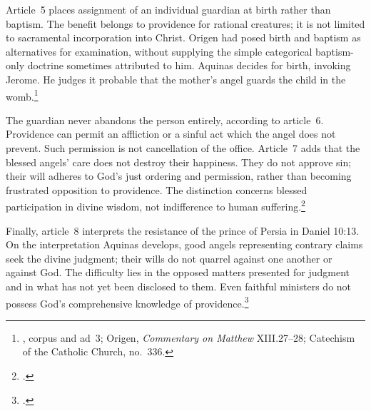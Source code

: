Article~5 places assignment of an individual guardian at birth rather than baptism. The benefit belongs to providence for rational creatures; it is not limited to sacramental incorporation into Christ. Origen had posed birth and baptism as alternatives for examination, without supplying the simple categorical baptism-only doctrine sometimes attributed to him. Aquinas decides for birth, invoking Jerome. He judges it probable that the mother's angel guards the child in the womb.\footnote{, corpus and ad~3; Origen, \emph{Commentary on Matthew} XIII.27--28; Catechism of the Catholic Church, no.~336.}

The guardian never abandons the person entirely, according to article~6. Providence can permit an affliction or a sinful act which the angel does not prevent. Such permission is not cancellation of the office. Article~7 adds that the blessed angels' care does not destroy their happiness. They do not approve sin; their will adheres to God's just ordering and permission, rather than becoming frustrated opposition to providence. The distinction concerns blessed participation in divine wisdom, not indifference to human suffering.\footnote{.}

Finally, article~8 interprets the resistance of the prince of Persia in Daniel 10:13. On the interpretation Aquinas develops, good angels representing contrary claims seek the divine judgment; their wills do not quarrel against one another or against God. The difficulty lies in the opposed matters presented for judgment and in what has not yet been disclosed to them. Even faithful ministers do not possess God's comprehensive knowledge of providence.\footnote{.}

